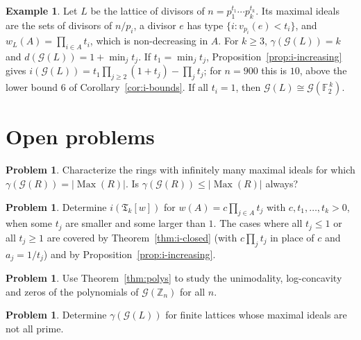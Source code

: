 \documentclass[11pt]{amsart}
\theoremstyle{definition}
\newtheorem{example}[theorem]{Example}
\newtheorem{problem}[theorem]{Problem}
\theoremstyle{remark}
\newcommand{\Max}{\operatorname{Max}}
\newcommand{\G}{\mathcal{G}}
\newcommand{\TG}{\mathfrak{T}}
\newcommand{\Z}{\mathbb{Z}}
\newcommand{\FF}{\mathbb{F}}
\newcommand{\Bool}[1]{\FF_2^{\,#1}}
\begin{document}
\begin{example}\label{ex:divisor-lattice}
Let $L$ be the lattice of divisors of $n=p_1^{t_1}\cdots p_k^{t_k}$. Its maximal ideals are the sets
of divisors of $n/p_i$, a divisor $e$ has type $\{i:v_{p_i}(e)<t_i\}$, and
$w_L(A)=\prod_{i\in A}t_i$, which is non-decreasing in $A$. For $k\ge3$, $\gamma(\G(L))=k$ and
$d(\G(L))=1+\min_jt_j$. If $t_1=\min_jt_j$, Proposition~\ref{prop:i-increasing} gives
$i(\G(L))=t_1\prod_{j\ge2}(1+t_j)-\prod_jt_j$; for $n=900$ this is $10$, above the lower bound $6$
of Corollary~\ref{cor:i-bounds}. If all $t_i=1$, then $\G(L)\cong\G(\Bool k)$.
\end{example}

\section{Open problems}\label{sec:problems}

\begin{problem}
Characterize the rings with infinitely many maximal ideals for which $\gamma(\G(R))=|\Max(R)|$. Is
$\gamma(\G(R))\le|\Max(R)|$ always?
\end{problem}

\begin{problem}
Determine $i(\TG_k[w])$ for $w(A)=c\prod_{j\in A}t_j$ with $c,t_1,\dots,t_k>0$, when some $t_j$ are
smaller and some larger than $1$. The cases where all $t_j\le1$ or all $t_j\ge1$ are covered by
Theorem~\ref{thm:i-closed} (with $c\prod_jt_j$ in place of $c$ and $a_j=1/t_j$) and by
Proposition~\ref{prop:i-increasing}.
\end{problem}

\begin{problem}
Use Theorem~\ref{thm:polys} to study the unimodality, log-concavity and zeros of the polynomials of
$\G(\Z_n)$ for all $n$.
\end{problem}

\begin{problem}
Determine $\gamma(\G(L))$ for finite lattices whose maximal ideals are not all prime.
\end{problem}
\end{document}
